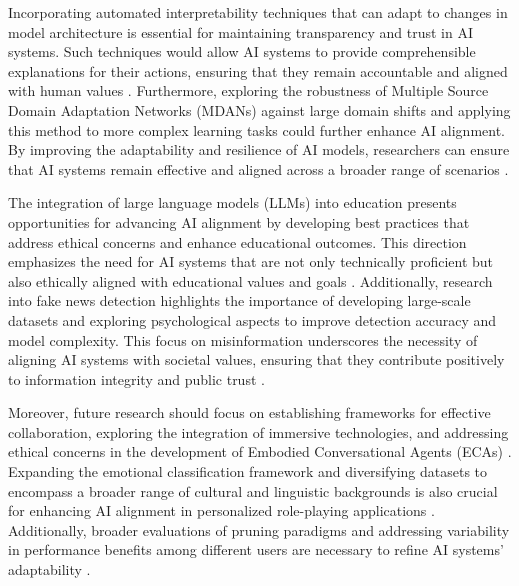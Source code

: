 Incorporating automated interpretability techniques that can adapt to changes in model architecture is essential for maintaining transparency and trust in AI systems. Such techniques would allow AI systems to provide comprehensible explanations for their actions, ensuring that they remain accountable and aligned with human values \cite{jucys2024interpretabilityactionexploratoryanalysis}. Furthermore, exploring the robustness of Multiple Source Domain Adaptation Networks (MDANs) against large domain shifts and applying this method to more complex learning tasks could further enhance AI alignment. By improving the adaptability and resilience of AI models, researchers can ensure that AI systems remain effective and aligned across a broader range of scenarios \cite{zhao2017multiplesourcedomainadaptation}.



The integration of large language models (LLMs) into education presents opportunities for advancing AI alignment by developing best practices that address ethical concerns and enhance educational outcomes. This direction emphasizes the need for AI systems that are not only technically proficient but also ethically aligned with educational values and goals \cite{kasneci2023chatgpt}. Additionally, research into fake news detection highlights the importance of developing large-scale datasets and exploring psychological aspects to improve detection accuracy and model complexity. This focus on misinformation underscores the necessity of aligning AI systems with societal values, ensuring that they contribute positively to information integrity and public trust \cite{shu2017fakenewsdetectionsocial}.



Moreover, future research should focus on establishing frameworks for effective collaboration, exploring the integration of immersive technologies, and addressing ethical concerns in the development of Embodied Conversational Agents (ECAs) \cite{korre2023takesvillagemultidisciplinaritycollaboration}. Expanding the emotional classification framework and diversifying datasets to encompass a broader range of cultural and linguistic backgrounds is also crucial for enhancing AI alignment in personalized role-playing applications \cite{tao2024rolecraftglmadvancingpersonalizedroleplaying}. Additionally, broader evaluations of pruning paradigms and addressing variability in performance benefits among different users are necessary to refine AI systems' adaptability \cite{kaur2024cropcontextwiserobuststatic}.



